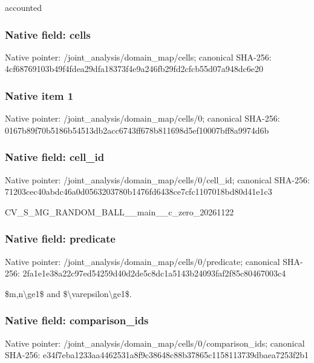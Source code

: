 \documentclass[10pt,a4paper]{article}
\begin{document}
accounted


\subsubsection{Native field: cells}


Native pointer: /joint\_analysis/domain\_map/cells; canonical SHA-256: 4cf68769103b49f4fdea29df\allowbreak{}a18373f4e9a246fb29fd2cfc\allowbreak{}b55d07a948dc6e20



\subsubsection{Native item 1}


Native pointer: /joint\_analysis/domain\_map/cells/0; canonical SHA-256: 0167b89f70b5186b54513db2\allowbreak{}acc6743ff678b811698d5ef1\allowbreak{}0007bff8a9974d6b



\subsubsection{Native field: cell\_id}


Native pointer: /joint\_analysis/domain\_m\allowbreak{}ap/cells/0/cell\_id; canonical SHA-256: 71203cec40abdc46a0d05632\allowbreak{}03780b1476fd6438ce7cfc11\allowbreak{}07018bd80d41e1c3


CV\_S\_MG\_RANDOM\_BALL\_\_mai\allowbreak{}n\_\_c\_zero\_20261122


\subsubsection{Native field: predicate}


Native pointer: /joint\_analysis/domain\_m\allowbreak{}ap/cells/0/predicate; canonical SHA-256: 2fa1e1e38a22c97ed54259d4\allowbreak{}0d2de5c8dc1a5143b24093fa\allowbreak{}f2f85c80467003c4


\$m,n\textbackslash{}ge1\$ and \$\textbackslash{}varepsilon\textbackslash{}ge1\$.


\subsubsection{Native field: comparison\_ids}


Native pointer: /joint\_analysis/domain\_m\allowbreak{}ap/cells/0/comparison\_id\allowbreak{}s; canonical SHA-256: e34f7eba1233aa4462531a8f\allowbreak{}9c38648c88b37865c1158113\allowbreak{}739dbaea7253f2b1
\end{document}
